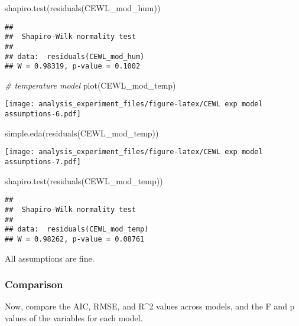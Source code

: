 \documentclass[
]{article}
\newenvironment{Shaded}{\begin{snugshade}}{\end{snugshade}}
\newcommand{\CommentTok}[1]{\textcolor[rgb]{0.56,0.35,0.01}{\textit{#1}}}
\newcommand{\FunctionTok}[1]{\textcolor[rgb]{0.00,0.00,0.00}{#1}}
\newcommand{\NormalTok}[1]{#1}
\begin{document}
\begin{Shaded}
\begin{Highlighting}[]
\FunctionTok{shapiro.test}\NormalTok{(}\FunctionTok{residuals}\NormalTok{(CEWL\_mod\_hum))}
\end{Highlighting}
\end{Shaded}

\begin{verbatim}
## 
##  Shapiro-Wilk normality test
## 
## data:  residuals(CEWL_mod_hum)
## W = 0.98319, p-value = 0.1002
\end{verbatim}

\begin{Shaded}
\begin{Highlighting}[]
\CommentTok{\# temperature model}
\FunctionTok{plot}\NormalTok{(CEWL\_mod\_temp)}
\end{Highlighting}
\end{Shaded}

\texttt{[image: analysis\_experiment\_files/figure-latex/CEWL exp model assumptions-6.pdf]}

\begin{Shaded}
\begin{Highlighting}[]
\FunctionTok{simple.eda}\NormalTok{(}\FunctionTok{residuals}\NormalTok{(CEWL\_mod\_temp))}
\end{Highlighting}
\end{Shaded}

\texttt{[image: analysis\_experiment\_files/figure-latex/CEWL exp model assumptions-7.pdf]}

\begin{Shaded}
\begin{Highlighting}[]
\FunctionTok{shapiro.test}\NormalTok{(}\FunctionTok{residuals}\NormalTok{(CEWL\_mod\_temp))}
\end{Highlighting}
\end{Shaded}

\begin{verbatim}
## 
##  Shapiro-Wilk normality test
## 
## data:  residuals(CEWL_mod_temp)
## W = 0.98262, p-value = 0.08761
\end{verbatim}

All assumptions are fine.

\hypertarget{comparison-3}{%
\subsubsection{Comparison}\label{comparison-3}}

Now, compare the AIC, RMSE, and R\^{}2 values across models, and the F
and p values of the variables for each model.
\end{document}
